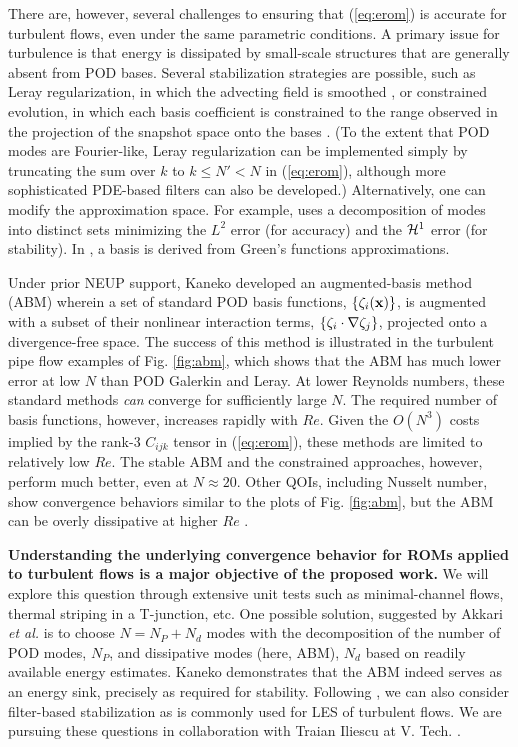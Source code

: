 There are, however, several challenges to ensuring that (\ref{eq:erom})
is accurate for turbulent flows, even under the same parametric conditions.
A primary issue for turbulence is that energy is dissipated by small-scale
structures that are generally absent from POD bases.  Several stabilization
strategies are possible, such as Leray regularization, in which the advecting
field is smoothed \cite{wells2017evolve}, or constrained evolution, in which
each basis coefficient is constrained to the range observed in the projection
of the snapshot space onto the bases \cite{fick18}.  (To the extent that 
POD modes are Fourier-like, Leray regularization can be implemented simply by
truncating the sum over $k$ to $k \leq N' < N$ in (\ref{eq:erom}), although
more sophisticated PDE-based filters can also be developed.) Alternatively,
one can modify the approximation space.  For example,
\cite{akkari19} uses a decomposition of modes into distinct sets minimizing the
$L^2$ error (for accuracy) and the ${\cal H}^1$ error (for stability).  In
\cite{khodkar2019}, a basis is derived from Green's functions approximations.

   Under prior NEUP support, Kaneko \cite{kaneko22a,kaneko22} developed an
augmented-basis method (ABM) wherein a set of standard POD basis functions,
$\{\mathbf{\zeta}_i(\mathbf{x}) \}$,  is augmented with a subset of their nonlinear
interaction terms, $\{\mathbf{\zeta}_i \cdot \nabla \mathbf{\zeta}_j\}$, projected onto
a divergence-free space.  The success of this
method is illustrated in the turbulent pipe flow examples of Fig. \ref{fig:abm},
which shows that the ABM has much lower error at low $N$ than POD Galerkin and
Leray.  At lower Reynolds numbers, these standard methods {\em can} converge 
for sufficiently large $N$.  The required number of basis functions, however,
increases rapidly with $Re$.  Given the $O(N^3)$ costs implied by the rank-3
$C_{ijk}$ tensor in (\ref{eq:erom}), these methods are limited to relatively
low $Re$.  The stable ABM and the constrained approaches, however, perform much better,
even at $N\approx 20$.  Other QOIs, including Nusselt number, show convergence
behaviors similar to the plots of Fig. \ref{fig:abm}, but the ABM can be overly
dissipative at higher $Re$ \cite{kaneko22}.

\textbf{Understanding the
underlying convergence behavior for ROMs applied to turbulent flows is a major
objective of the proposed work.} We will explore this question through
extensive unit tests such as minimal-channel flows, thermal striping in a
T-junction, etc.
  One possible solution, suggested by Akkari {\em et al.} \cite{akkari19} is to
choose $N=N_P + N_d$ modes with the decomposition of the number
of POD modes, $N_P$, and dissipative modes (here, ABM), $N_d$ based on
readily available energy estimates.  
Kaneko \cite{kaneko22a,kaneko22} demonstrates that the ABM indeed serves as an
energy sink, precisely as required for stability.
  Following \cite{wells2017evolve}, we can also consider filter-based
stabilization as is commonly used for LES of turbulent flows.  We are 
pursuing these questions in collaboration with Traian Iliescu at V. Tech.
\cite{mou2021}.

